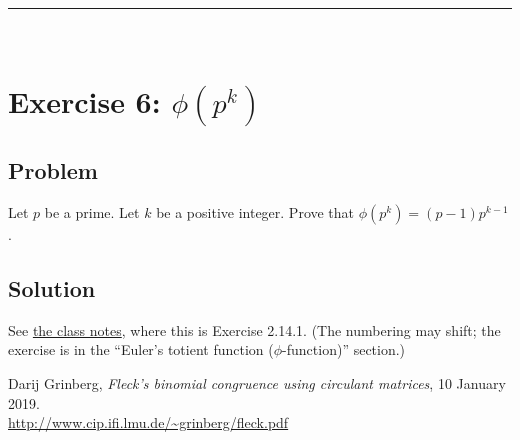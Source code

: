 \documentclass[paper=a4, fontsize=12pt]{scrartcl} %
\newcommand{\tup}[1]{\left( #1 \right)}
\newcommand{\horrule}[1]{\rule{\linewidth}{#1}} %
\theoremstyle{plainsl}
\theoremstyle{definition}
\theoremstyle{remark}
\begin{document}
\horrule{0.3pt} \\[0.4cm]

\section{Exercise 6: $\phi\tup{p^k}$}

\subsection{Problem}

Let $p$ be a prime.
Let $k$ be a positive integer.
Prove that $\phi\tup{p^k} = \tup{p-1} p^{k-1}$.

\subsection{Solution}

See
\href{http://www.cip.ifi.lmu.de/~grinberg/t/19s/notes.pdf}{the class notes},
where this is Exercise 2.14.1.
(The numbering may shift; the exercise is in the
``Euler's totient function ($\phi$-function)''
section.)

\begin{thebibliography}{99999999}                                                                                         %



Darij Grinberg,
\textit{Fleck's binomial congruence using
circulant matrices},
10 January 2019. \\
\url{http://www.cip.ifi.lmu.de/~grinberg/fleck.pdf}

\end{thebibliography}
\end{document}
